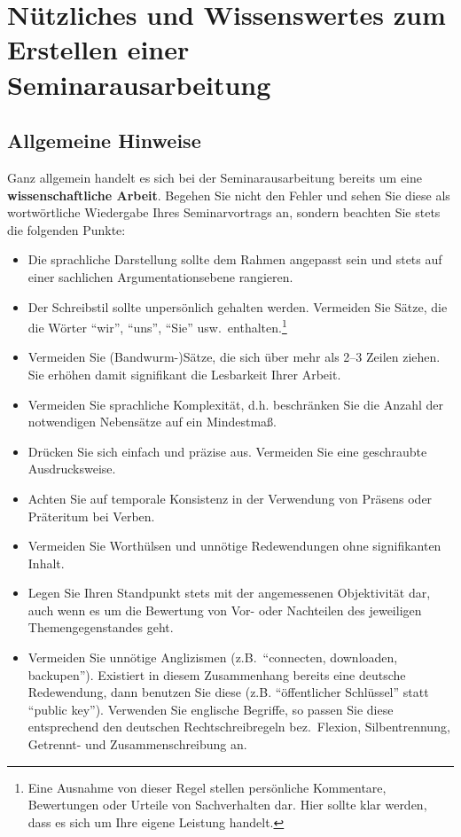 %
\section{Nützliches und Wissenswertes zum Erstellen einer Seminarausarbeitung}
\label{sec_stil}

\subsection{Allgemeine Hinweise}
Ganz allgemein handelt es sich bei der Seminarausarbeitung bereits um eine {\bf wissenschaftliche Arbeit}.
Begehen Sie nicht den Fehler und sehen Sie diese als wortwörtliche Wiedergabe Ihres Seminarvortrags an, sondern beachten Sie stets die folgenden Punkte:
\begin{itemize}
\item Die sprachliche Darstellung sollte dem Rahmen angepasst sein und stets auf einer sachlichen Argumentationsebene rangieren.
\item Der Schreibstil sollte unpersönlich gehalten werden. 
Vermeiden Sie Sätze, die die Wörter "`wir"', "`uns"', "`Sie"' usw.~enthalten.\footnote{Eine Ausnahme von dieser Regel stellen persönliche Kommentare, Bewertungen oder Urteile von Sachverhalten dar. Hier sollte klar werden, dass es sich um Ihre eigene Leistung handelt.}
\item Vermeiden Sie (Bandwurm-)Sätze, die sich über mehr als 2--3 Zeilen ziehen. Sie erhöhen damit signifikant die Lesbarkeit Ihrer Arbeit.
\item Vermeiden Sie sprachliche Komplexität, d.h. beschränken Sie die Anzahl der notwendigen Nebensätze auf ein Mindestmaß.
\item Drücken Sie sich einfach und präzise aus. Vermeiden Sie eine \glqq geschraubte\grqq\, Ausdrucksweise.
\item Achten Sie auf temporale Konsistenz in der Verwendung von Präsens oder Präteritum  bei Verben.
\item Vermeiden Sie Worthülsen und unnötige Redewendungen ohne signifikanten Inhalt. 
\item Legen Sie Ihren Standpunkt stets mit der angemessenen Objektivität dar, auch wenn es um die Bewertung von Vor- oder Nachteilen des jeweiligen Themengegenstandes geht.
\item Vermeiden Sie unnötige Anglizismen (z.B.~"`connecten, downloaden, backupen"').
Existiert in diesem Zusammenhang bereits eine deutsche Redewendung, dann benutzen Sie diese (z.B. "`öffentlicher Schlüssel"' statt "`public key"').
Verwenden Sie englische Begriffe, so passen Sie diese entsprechend den deutschen Rechtschreibregeln bez.~Flexion, Silbentrennung, Getrennt- und Zusammenschreibung an.

\end{itemize}
